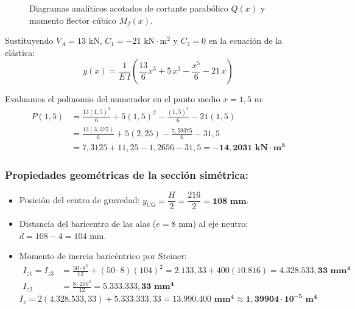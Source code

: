 \begin{figure}[H]
{%
    }
    \caption{Diagramas analíticos acotados de cortante parabólico $Q(x)$ y momento flector cúbico $M_f(x)$.}
    \label{fig:examen_viga_triangular_diagramas}
\end{figure}


Sustituyendo $V_A = 13\text{ kN}$, $C_1 = -21\text{ kN}\cdot\text{m}^2$ y $C_2 = 0$ en la ecuación de la elástica:
\begin{equation}
    \boxed{y(x) = \frac{1}{E\,I}\left( \frac{13}{6}x^3 + 5\,x^2 - \frac{x^5}{6} - 21\,x \right)}
\end{equation}

Evaluamos el polinomio del numerador en el punto medio $x = 1{,}5\text{ m}$:
\begin{align}
    P(1{,}5) & = \frac{13(1{,}5)^3}{6} + 5(1{,}5)^2 - \frac{(1{,}5)^5}{6} - 21(1{,}5) \nonumber \\
             & = \frac{13(3{,}375)}{6} + 5(2{,}25) - \frac{7{,}59375}{6} - 31{,}5 \nonumber \\
             & = 7{,}3125 + 11{,}25 - 1{,}2656 - 31{,}5 = \mathbf{-14{,}2031\text{ kN}\cdot\text{m}^3}
\end{align}

\subsubsection*{Propiedades geométricas de la sección simétrica:}
\begin{itemize}
    \item Posición del centro de gravedad: $y_{\text{CG}} = \dfrac{H}{2} = \dfrac{216}{2} = \mathbf{108\text{ mm}}$.
    \item Distancia del baricentro de las alas ($e = 8\text{ mm}$) al eje neutro: $d = 108 - 4 = 104\text{ mm}$.
    \item Momento de inercia baricéntrico por Steiner:
          \begin{align}
              I_{z1} = I_{z3} & = \frac{50 \cdot 8^3}{12} + (50 \cdot 8)(104)^2 = 2.133{,}33 + 400(10.816) = \mathbf{4.328.533{,}33\text{ mm}^4} \\[4pt]
              I_{z2}          & = \frac{8 \cdot 200^3}{12} = \mathbf{5.333.333{,}33\text{ mm}^4}
          \end{align}
          \begin{equation}
              \boxed{I_z = 2(4.328.533{,}33) + 5.333.333{,}33 = \mathbf{13.990.400\text{ mm}^4 \approx 1{,}39904 \cdot 10^{-5}\text{ m}^4}}
          \end{equation}
\end{itemize}


